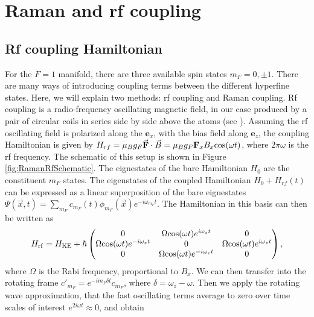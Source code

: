 \section{Raman and rf coupling}\label{chap:4sec:rf}

\subsection{Rf coupling Hamiltonian}

	For the $F=1$ manifold, there are three available spin states $m_F = 0,\pm1$. There are many ways of introducing coupling terms between the different hyperfine states. Here, we will explain two methods: rf coupling and Raman coupling. Rf coupling is a radio-frequency oscillating magnetic field, in our case produced by a pair of circular coils in series side by side above the atoms (see \cite{KarinaThesis}). Assuming the rf oscillating field is polarized along the $\mathbf{e}_x$, with the bias field along $\mathbf{e}_z$, the coupling Hamiltonian is given by $H_{rf} = \mu_B g_F \vec{\mathbf{F}}\cdot{}\vec{B} = \mu_B g_F \mathbf{F}_x B_x {\rm cos}(\omega t)$, where $2 \pi\omega$ is the rf frequency. The schematic of this setup is shown in Figure \ref{fig:RamanRfSchematic}.
	The eignestates of the bare Hamiltonian $H_0$ are the constituent $m_F$ states. The eigenstates of the coupled Hamiltonian $H_0 + H_{rf}(t)$ can be expressed as a linear superposition of the bare eignestates $\Psi(\vec{x},t)=\sum_{m_F}c_{m_F}(t)\phi_{m_F}(\vec{x})e^{-i\omega_{m_F}t}$. The Hamiltonian in this basis can then be written as\cite{LCT}
\begin{equation}
H_{\rm rf} = H_{\rm KE} + \hbar
 \begin{pmatrix} 0 & \Omega {\rm cos}(\omega t)e^{i\omega_zt}  & 0  \\ 
\Omega {\rm cos}(\omega t)e^{-i\omega_zt}  & 0 &  \Omega {\rm cos}(\omega t)e^{i\omega_zt} \\
 0 & \Omega {\rm cos}(\omega t)e^{-i\omega_zt}  & 0  \\
 \end{pmatrix} \\,
\end{equation}
where $\Omega$ is the Rabi frequency, proportional to $B_x$.
	 We can then transfer into the rotating frame $c'_{m_F} = e^{-i m_F \delta t}c_{m_F}$, where $\delta = \omega_z - \omega$. Then we apply the rotating wave approximation, that the fast oscillating terms average to zero over time scales of interest $e^{2i\omega t}\approx 0$, and obtain 

